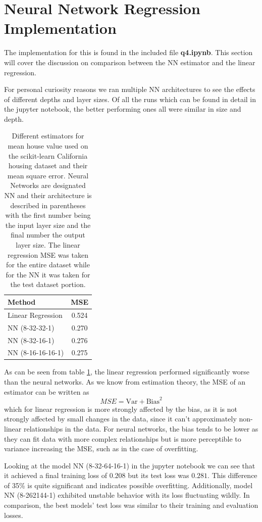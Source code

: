\clearpage
\section{Neural Network Regression Implementation}

The implementation for this is found in the included file \textbf{q4.ipynb}. This section will cover the discussion on comparison between the NN estimator and the linear regression.

For personal curiosity reasons we ran multiple NN architectures to see the effects of different depths and layer sizes. Of all the runs which can be found in detail in the jupyter notebook, the better performing ones all were similar in size and depth.

\begin{table}[hbt]\label{comparisons}
\centering
  \begin{tabular}{l|c}
   Method & MSE \\
    \hline
   Linear Regression & 0.524 \\
   NN (8-32-32-1) & 0.270 \\
   NN (8-32-16-1) & 0.276 \\
   NN (8-16-16-16-1) & 0.275
  \end{tabular}
  \caption{Different estimators for mean house value used on the scikit-learn California housing dataset and their mean square error. Neural Networks are designated NN and their architecture is described in parentheses with the first number being the input layer size and the final number the output layer size. The linear regression MSE was taken for the entire dataset while for the NN it was taken for the test dataset portion.}
\end{table}

As can be seen from table \ref{comparisons}, the linear regression performed significantly worse than the neural networks. As we know from estimation theory, the MSE of an estimator can be written as
\begin{equation}
	MSE = \text{Var}+\text{Bias}^2
\end{equation}
which for linear regression is more strongly affected by the bias, as it is not strongly affected by small changes in the data, since it can't approximately non-linear relationships in the data. For neural networks, the bias tends to be lower as they can fit data with more complex relationships but is more perceptible to variance increasing the MSE, such as in the case of overfitting.

Looking at the model NN (8-32-64-16-1) in the jupyter notebook we can see that it achieved a final training loss of $0.208$ but its test loss was $0.281$. This difference of 35\% is quite significant and indicates possible overfitting. Additionally, model NN (8-262144-1) exhibited unstable behavior with its loss fluctuating wildly. In comparison, the best models' test loss was similar to their training and evaluation losses.